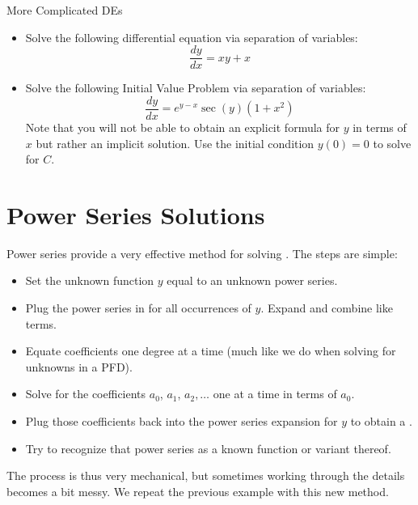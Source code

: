 \begin{exercise}{More Complicated DEs \Coffeecup \Coffeecup \Coffeecup}

\begin{itemize}
\item Solve the following differential equation via separation of variables: $$ \frac{dy}{dx}=xy+x $$
\vspace*{2in}
\item  Solve the following Initial Value Problem  via separation of variables: $$ \frac{dy}{dx}=e^{y-x}\sec(y)(1+x^2) $$ Note that you will not be able to obtain an explicit formula for $y$ in terms of $x$ but rather an implicit solution.  Use the initial condition $ y(0)=0$ to solve for $C$.
\vspace*{4in}
\end{itemize}
\end{exercise}

\section{Power Series Solutions} Power series provide a very effective method for solving .  The steps are simple:
\begin{itemize}
\item Set the unknown function $y$ equal to an unknown power series.
\item Plug the power series in for all occurrences of $y$.  Expand and combine like terms. 
\item Equate coefficients one degree at a time (much like we do when solving for unknowns in a PFD).
\item Solve for the coefficients $a_0$, $a_1$, $a_2, \ldots$ one at a time in terms of $a_0$. 
\item Plug those coefficients back into the power series expansion for $y$ to obtain a . \item Try to recognize that power series as a known function or variant thereof.  
\end{itemize}
The process is thus very mechanical, but sometimes working through the details becomes a bit messy.  We repeat the previous example with this new method.

